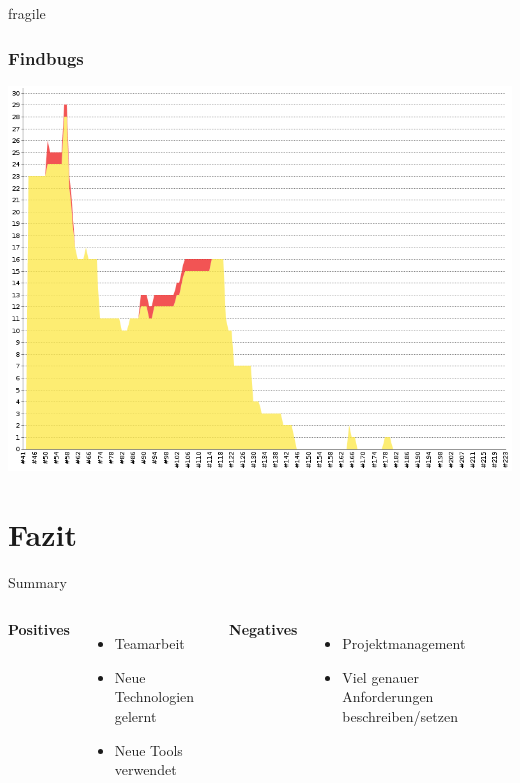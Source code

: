 \documentclass[10pt, compress]{beamer}
\begin{document}
\begin{frame}{fragile}
   \frametitle{Findbugs}
\includegraphics[scale=0.35]{findbugs}
\end{frame}


\section{Fazit}
\begin{frame}{Summary}



\begin{columns}[onlytextwidth]
      \textbf{Positives}
\begin{itemize}
  \item Teamarbeit
  \item Neue Technologien gelernt
  \item Neue Tools verwendet
\end{itemize}

    \textbf{Negatives}
\begin{itemize}
  \item Projektmanagement
  \item Viel genauer Anforderungen beschreiben/setzen
\end{itemize}
  \end{columns}

\end{frame}

\end{document}
